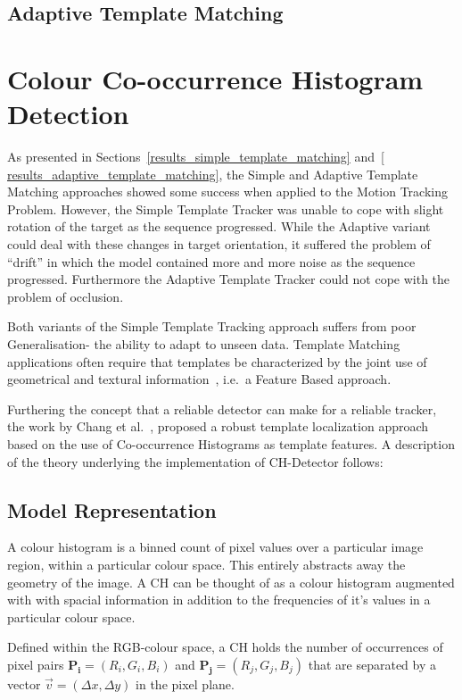 \subsection{Adaptive Template Matching}\label{theoretical_framework_adaptive_tm}


\section{Colour Co-occurrence Histogram Detection}\label{theoretical_framework_ch}
As presented in Sections~\ref{results_simple_template_matching} and~\ref{
results_adaptive_template_matching}, the Simple and Adaptive Template Matching
approaches showed some success when applied to the Motion
Tracking Problem. However, the Simple Template Tracker was unable to cope with
slight rotation of the target as the sequence progressed.
While the Adaptive variant could deal with these changes in target
orientation, it suffered the problem of ``drift'' in which the model contained
more and more noise as the sequence progressed.
Furthermore the Adaptive Template Tracker could not cope with the problem of
occlusion.

Both variants of the Simple Template Tracking approach suffers from poor Generalisation- the
ability to adapt to unseen data. Template Matching applications often require
that templates be characterized by the joint use of geometrical and textural
information~\cite{Brunelli}, i.e.\ a Feature Based approach.

Furthering the concept that a reliable detector can make for a reliable tracker,
the work by Chang et al.~\cite{Chang1999}, proposed a robust template
localization approach based on the use of Co-occurrence Histograms as template
features. A description of the theory underlying the implementation of CH-Detector 
follows:

\subsection{Model Representation}
A colour histogram is a binned count of pixel values over a particular image
region, within a particular colour space. This entirely abstracts away the geometry of
the image.
A CH can be thought of as a colour histogram augmented with with spacial
information in addition to the frequencies of it's values in a particular colour
space.

Defined within the RGB-colour space, a CH holds the number of occurrences of
pixel pairs $\mathbf{P_i}=(R_i,G_i,B_i)$ and $\mathbf{P_j}=(R_j,G_j,B_j)$ that
are separated by a vector $\vec{v}=(\Delta{x}, \Delta{y})$ in the pixel plane.

